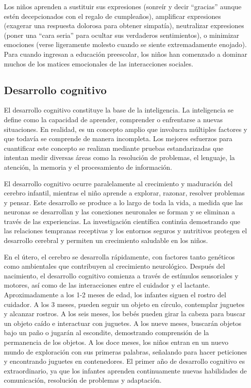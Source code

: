 \documentclass[11pt,letterpaper]{report}
\begin{document}
Los niños aprenden a sustituir sus expresiones (sonreír y decir ``gracias''
aunque estén decepcionados con el regalo de cumpleaños), amplificar expresiones
(exagerar una respuesta dolorosa para obtener simpatía), neutralizar
expresiones (poner una ``cara seria'' para ocultar sus verdaderos sentimientos),
o minimizar emociones (verse ligeramente molesto cuando se siente
extremadamente enojado). Para cuando ingresan a educación preescolar, los niños
han comenzado a dominar muchos de los matices emocionales de las interacciones
sociales. \cite{Gerber2011}

\subsection{Desarrollo cognitivo}
El desarrollo cognitivo constituye la base de la inteligencia. La inteligencia
se define como la capacidad de aprender, comprender o enfrentarse a nuevas
situaciones. En realidad, es un concepto amplio que involucra múltiples
factores y que todavía se comprende de manera incompleta. Los mejores esfuerzos
para cuantificar este concepto se realizan mediante pruebas estandarizadas que
intentan medir diversas áreas como la resolución de problemas, el lenguaje, la
atención, la memoria y el procesamiento de información. \cite{Wilks2010}

El desarrollo cognitivo ocurre paralelamente al crecimiento y maduración del
cerebro infantil, mientras el niño aprende a explorar, razonar, resolver
problemas y pensar. Este desarrollo se produce a lo largo de toda la vida, a
medida que las neuronas se desarrollan y las conexiones neuronales se forman y
se eliminan a través de las experiencias. La investigación científica continúa
demostrando que las relaciones tempranas receptivas y los entornos seguros y
nutritivos protegen el desarrollo cerebral y permiten un crecimiento saludable
en los niños. \cite{Crotty2023}

En el útero, el cerebro se desarrolla rápidamente, con factores tanto genéticos
como ambientales que contribuyen al crecimiento neurológico. Después del
nacimiento, el desarrollo cognitivo comienza a través de estímulos sensoriales
y motores, así como de las interacciones entre el cuidador y el lactante.
Aproximadamente a los 1-2 meses de edad, los infantes siguen el rostro del
cuidador. A los 3 meses, pueden seguir un objeto en círculo, contemplar
juguetes y alcanzar rostros. A los seis meses, los bebés pueden girar la
cabeza para buscar un objeto caído e interactuar con juguetes. A los nueve
meses, buscarán objetos bajo un paño o jugarán al escondite, demostrando
comprensión de la permanencia de los objetos. A los doce meses, los niños
entran en un nuevo mundo de exploración con sus primeras palabras, señalando
para hacer peticiones y encontrando juguetes en contenedores. El primer año de
desarrollo cognitivo es extraordinario, ya que los infantes aprenden
continuamente nuevas habilidades de comunicación, resolución de problemas y
adaptación. \cite{Crotty2023}
\end{document}
